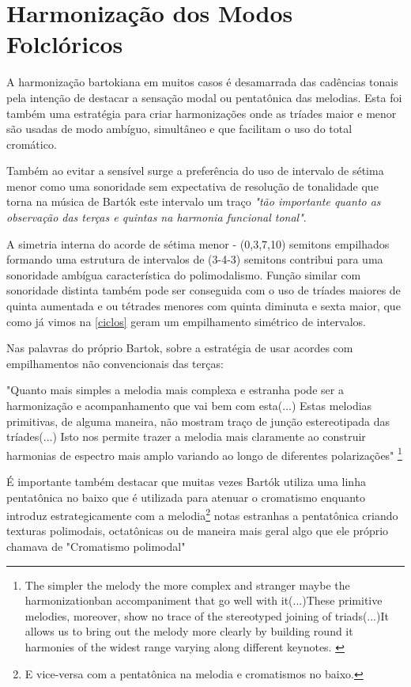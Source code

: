 \documentclass[
	12pt,				%
	openright,			%
	twoside,			%
	a4paper,			%
	english,			%
	french,				%
	spanish,			%
	brazil				%
	]{abntex2}
\begin{document}
\section{Harmonização dos Modos Folclóricos}


A harmonização  bartokiana em muitos casos é desamarrada das cadências tonais pela intenção de destacar a sensação modal ou pentatônica das melodias. Esta foi também uma estratégia para criar harmonizações onde as tríades maior e menor são usadas de modo ambíguo, simultâneo e que facilitam o uso do total cromático. 

Também ao evitar a sensível surge a preferência do uso de intervalo de sétima menor como uma sonoridade sem expectativa de resolução de tonalidade que torna na música de Bartók este intervalo um traço \textit{"tão importante quanto as observação das terças e quintas na harmonia funcional tonal"}\cite[p. 28]{antokoletz1984music}. 

A simetria interna do acorde de sétima menor - (0,3,7,10) semitons empilhados formando uma estrutura de intervalos de (3-4-3) semitons contribui para uma sonoridade ambígua característica do polimodalismo. Função similar com sonoridade distinta também pode ser conseguida com o uso de tríades maiores de quinta aumentada e ou tétrades menores com quinta diminuta e sexta maior, que como já vimos na \autoref{ciclos} geram um empilhamento simétrico de intervalos.

Nas palavras do próprio Bartok, sobre a estratégia de usar acordes com empilhamentos não convencionais das terças:

\begin{citacao}
"Quanto mais simples a melodia mais complexa e estranha pode ser a harmonização e acompanhamento que vai bem com esta(...) Estas melodias primitivas, de alguma maneira, não mostram traço de junção estereotipada das tríades(...) Isto nos permite trazer a melodia mais claramente ao construir harmonias de espectro mais amplo variando ao longo de diferentes polarizações"
\cite[p. 342]{bartok1993bela}\footnote{The simpler the melody the more complex and stranger maybe the harmonizationban accompaniment that go well with it(...)These primitive melodies, moreover, show no trace of the stereotyped joining of triads(...)It allows us to bring out the melody more clearly by building round it harmonies of the widest range varying along different keynotes. \cite[p. 342]{bartok1993bela}}
\end{citacao}


É importante também destacar que muitas vezes Bartók utiliza uma linha pentatônica no baixo que é utilizada para atenuar o cromatismo enquanto introduz estrategicamente com a melodia\footnote{E vice-versa com a pentatônica na melodia e cromatismos no baixo.} notas estranhas a pentatônica criando texturas polimodais, octatônicas ou de maneira mais geral algo que ele próprio chamava de "Cromatismo polimodal"\cite{antokoletz1984music}
\end{document}
